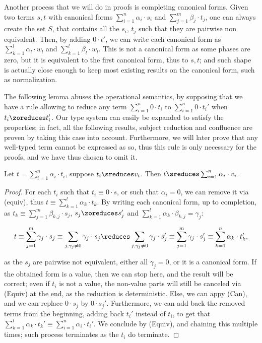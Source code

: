 Another process that we will do in proofs is completing canonical forms.
Given two terms $s, t$ with canonical forms $\sum_{i=1}^n \alpha_i \cdot s_i$
and $\sum_{j=1}^m \beta_j \cdot t_j$, one can always create the set $S$,
that contains all the $s_i$, $t_j$ such that they are pairwise non equivalent.
Then, by adding $0 \cdot t'$, we can write each canonical form as
$\sum_{k=1}^l \alpha_l \cdot w_l$ and $\sum_{k=1}^l \beta_l \cdot w_l$.
This is not a canonical form as some phases are zero, but it is equivalent to
the first canonical form, thus to $s, t$; and such shape is actually
close enough
to keep most existing results on the canonical form, such as normalization.

The following lemma abuses the operational semantics, by supposing that we
have a rule allowing to reduce any term $\sum_{i=1}^n 0 \cdot t_i$ to
$\sum_{i=1}^n 0 \cdot t_i'$ when $t_i \zoreduces t_i'$. Our type system
can easily be expanded to satisfy the properties; in fact, all the following
results, \ie{} subject reduction and confluence are proven by taking this case
into account. Furthermore, we will later prove that any well-typed term
cannot be expressed as so, thus this rule is only necessary for the proofs,
and we have thus chosen to omit it.

\begin{lemma}
  \label{lem:reduces-sum}
  Let $t = \sum_{i=1}^n \alpha_i \cdot t_i$, suppose $t_i \sreduces v_i$.
  Then $t \sreduces \sum_{i=1}^n \alpha_i \cdot v_i$.
\end{lemma}

\begin{proof}
  For each $t_i$ such that $t_i \equiv 0 \cdot s$,
  or such that $\alpha_i = 0$, we can remove it via (equiv),
  thus $t \equiv \sum_{k=1}^l \alpha_k \cdot t_k$.
  By writing each canonical form, up to completion, as
  $t_k \equiv \sum_{j=1}^m \beta_{k,j} \cdot s_j$,
  $s_j \zoreduces s_j'$
  and $\sum_{k=1}^l \alpha_k \cdot \beta_{k,j} = \gamma_j$:

  \[
    t \equiv \sum_{j=1}^m \gamma_j \cdot s_j \equiv \sum_{j, \gamma_j
    \neq 0} \gamma_j \cdot s_j
    \reduces \sum_{j, \gamma_j \neq 0} \gamma_j \cdot s_j' \equiv
    \sum_{j=1}^m \gamma_j \cdot s_j' \equiv \sum_{k=1}^n \alpha_k \cdot t_k',
  \]

  as the $s_j$ are pairwise not equivalent, either all $\gamma_j = 0$, or
  it is a canonical form. If the obtained form is a value,
  then we can stop here, and the result will be correct; even if $t_i$ is not
  a value, the non-value parts will still be canceled via (Equiv) at the
  end, as the reduction is deterministic.
  Else, we can appy (Can), and we can replace $0 \cdot s_j$ by $0 \cdot s_j'$.
  Furthermore, we can add back the removed terms from the beginning, adding
  back $t_i'$ instead of $t_i$, to get that
  $\sum_{k=1}^l \alpha_k \cdot t_k' \equiv \sum_{i=1}^n \alpha_i \cdot t_i'$.
  We conclude by (Equiv), and chaining this multiple times;
  such process terminates as the $t_i$ do terminate. \qedhere
\end{proof}

